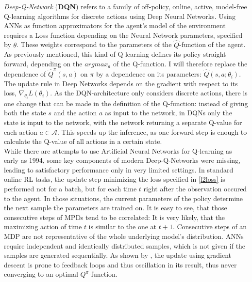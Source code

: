\textit{Deep-Q-Network} (\textbf{DQN}) refers to a family of off-policy, online, active, model-free Q-learning algorithms for discrete actions using Deep Neural Networks. %
Using ANNs as function approximators for the agent's model of the environment requires a Loss function depending on the Neural Network parameters, specified by $\theta$. These weights correspond to the parameters of the $\hat{Q}$-function of the agent. As previously mentioned, this kind of Q-learning defines its policy straight-forward, depending on the $argmax_a$ of the Q-function. I will therefore replace the dependence of $\hat{Q}^\pi(s,a)$ on $\pi$ by a dependence on its parameters: $\hat{Q}(s,a;\theta_i)$. The update rule in Deep Networks depends on the gradient with respect to its loss, $\nabla_{\theta_i}L(\theta_i)$.  %
As the DQN-architecture only considers discrete actions, there is one change that can be made in the definition of the Q-function: instead of giving both the state $s$ and the action $a$ as input to the network, in DQNs only the state is input to the network, with the network returning a separate Q-value for each action $a \in \mathcal{A}$. This speeds up the inference, as one forward step is enough to calculate the Q-value of all actions in a certain state.\\

\noindent While there are attempts to use Artificial Neural Networks for Q-learning as early as 1994\cite{rummery_-line_1994}, some key components of modern Deep-Q-Networks were missing, leading to satisfactory performance only in very limited settings. In standard online RL tasks, the update step minimizing the loss specified in \ref{l2loss} is performed not for a batch, but for each time $t$ right after the observation occured to the agent. 
In those situations, the current parameters of the policy determine the next sample the parameters are trained on. It is easy to see, that those consecutive steps of MPDs tend to be correlated: It is very likely, that the maximizing action of time $t$ is similar to the one at $t+1$. Consecutive steps of an MDP are not representative of the whole underlying model's distribution. ANNs require independent and identically distributed samples, which is not given if the samples are generated sequentially. As shown by \cite{john_n._tsitsiklis_analysis_1997}, the update using gradient descent is prone to feedback loops and thus oscillation in its result, thus never converging to an optimal $Q^\pi$-function. 

